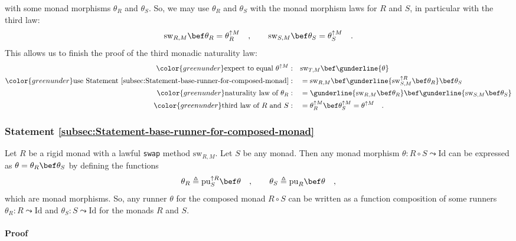 with some monad morphisms $\theta_{R}$ and $\theta_{S}$. So, we
may use $\theta_{R}$ and $\theta_{S}$ with the monad morphism laws
for $R$ and $S$, in particular with the third law:
\[
\text{sw}_{R,M}\bef\theta_{R}=\theta_{R}^{\uparrow M}\quad,\quad\quad\text{sw}_{S,M}\bef\theta_{S}=\theta_{S}^{\uparrow M}\quad.
\]
This allows us to finish the proof of the third monadic naturality
law:
\begin{align*}
{\color{greenunder}\text{expect to equal }\theta^{\uparrow M}:}\quad & \text{sw}_{T,M}\bef\gunderline{\theta}\\
{\color{greenunder}\text{use Statement~\ref{subsec:Statement-base-runner-for-composed-monad}}:}\quad & =\text{sw}_{R,M}\bef\gunderline{\text{sw}_{S,M}^{\uparrow R}\bef\theta_{R}}\bef\theta_{S}\\
{\color{greenunder}\text{naturality law of }\theta_{R}:}\quad & =\gunderline{\text{sw}_{R,M}\bef\theta_{R}}\bef\gunderline{\text{sw}_{S,M}\bef\theta_{S}}\\
{\color{greenunder}\text{third law of }R\text{ and }S:}\quad & =\theta_{R}^{\uparrow M}\bef\theta_{S}^{\uparrow M}=\theta^{\uparrow M}\quad.
\end{align*}


\subsubsection{Statement \label{subsec:Statement-base-runner-for-composed-monad}\ref{subsec:Statement-base-runner-for-composed-monad}}

Let $R$ be a rigid monad with a lawful \lstinline!swap! method $\text{sw}_{R,M}$.
Let $S$ be any monad. Then any monad morphism $\theta:R\circ S\leadsto\text{Id}$
can be expressed as $\theta=\theta_{R}\bef\theta_{S}$ by defining
the functions
\[
\theta_{R}\triangleq\text{pu}_{S}^{\uparrow R}\bef\theta\quad,\quad\quad\theta_{S}\triangleq\text{pu}_{R}\bef\theta\quad,
\]
which are monad morphisms. So, any runner $\theta$ for the composed
monad $R\circ S$ can be written as a function composition of some
runners $\theta_{R}:R\leadsto\text{Id}$ and $\theta_{S}:S\leadsto\text{Id}$
for the monads $R$ and $S$. 

\paragraph{Proof}

